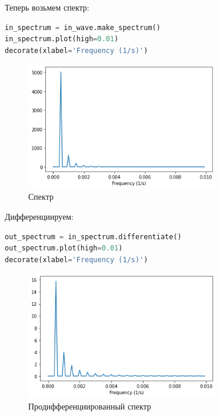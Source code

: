 \documentclass[a4paper,12pt]{report}
\begin{document}
    Теперь возьмем спектр:
    
\begin{lstlisting}[language=Python,caption=Спектр]
in_spectrum = in_wave.make_spectrum()
in_spectrum.plot(high=0.01)
decorate(xlabel='Frequency (1/s)')
\end{lstlisting}

    \begin{figure}[H]
        \centering
        \includegraphics[width=0.75\textwidth]{ex4_in_spectrum.png}
        \caption{Спектр}
        \label{fig:ex4_in_spectrum}
    \end{figure}

    Дифференциируем:
    
\begin{lstlisting}[language=Python,caption=Продифференциированный спектр]
out_spectrum = in_spectrum.differentiate()
out_spectrum.plot(high=0.01)
decorate(xlabel='Frequency (1/s)')
\end{lstlisting}

    \begin{figure}[H]
        \centering
        \includegraphics[width=0.75\textwidth]{ex4_out_spectrum.png}
        \caption{Продифференциированный спектр}
        \label{fig:ex4_out_spectrum}
    \end{figure}
\end{document}
